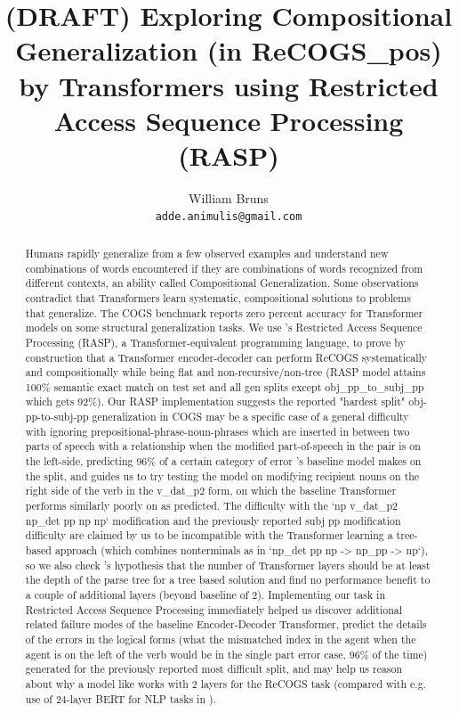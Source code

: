 \documentclass[11pt]{article}
\title{(DRAFT) Exploring Compositional Generalization (in ReCOGS\_pos) by Transformers using Restricted Access Sequence Processing (RASP)}
\author{William Bruns \\
  \texttt{adde.animulis@gmail.com}
}
\begin{document}
\maketitle
\begin{abstract}
Humans rapidly generalize from a few observed examples and understand new combinations of words encountered if they are combinations of words recognized from different contexts, an ability called Compositional Generalization. Some observations contradict that Transformers learn systematic, compositional solutions to problems that generalize. The COGS benchmark \cite{KimLinzen2020} reports zero percent accuracy for Transformer models on some structural generalization tasks.
We use \cite{Weiss2021}'s Restricted Access Sequence Processing (RASP), a Transformer-equivalent programming language, to prove by construction that a Transformer encoder-decoder can perform ReCOGS \cite{Wu2023} systematically and compositionally while being flat and non-recursive/non-tree (RASP model attains 100\% semantic exact match on test set and all gen splits except obj\_pp\_to\_subj\_pp which gets 92\%). Our RASP implementation suggests the reported "hardest split" obj-pp-to-subj-pp generalization in COGS may be a specific case of a general difficulty with ignoring prepositional-phrase-noun-phrases which are inserted in between two parts of speech with a relationship when the modified part-of-speech in the pair is on the left-side, predicting 96\% of a certain category of error \cite{Wu2023}'s baseline model makes on the split, and guides us to try testing the model on modifying recipient nouns on the right side of the verb in the v\_dat\_p2 form, on which the baseline Transformer performs similarly poorly on as predicted. The difficulty with the `np v\_dat\_p2 np\_det pp np np` modification and the previously reported subj pp modification difficulty are claimed by us to be incompatible with the Transformer learning a tree-based approach (which combines nonterminals as in `np\_det pp np -> np\_pp -> np`), so we also check \cite{Csordas2022}'s hypothesis that the number of Transformer layers should be at least the depth of the parse tree for a tree based solution and find no performance benefit to a couple of additional layers (beyond baseline of 2). Implementing our task in Restricted Access Sequence Processing immediately helped us discover additional related failure modes of the baseline Encoder-Decoder Transformer, predict the details of the errors in the logical forms (what the mismatched index in the agent when the agent is on the left of the verb would be in the single part error case, 96\% of the time) generated for the previously reported most difficult split, and may help us reason about why a model like \cite{Wu2023} works with 2 layers for the ReCOGS task (compared with e.g. use of 24-layer BERT for NLP tasks in \cite{tenney2019bertrediscoversclassicalnlp}).
\end{abstract}
\end{document}
